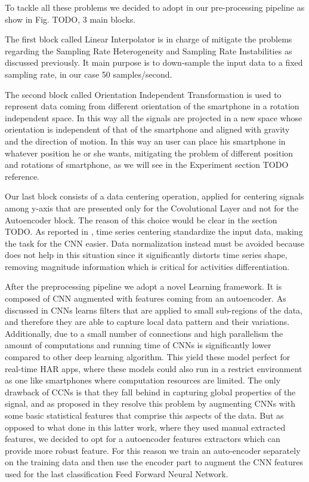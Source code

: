 To tackle all these problems we decided to adopt in our pre-processing pipeline as show in Fig. TODO, 3 main blocks.

The first block called Linear Interpolator is in charge of mitigate the problems regarding the Sampling Rate Heterogeneity and Sampling Rate Instabilities as discussed previously. It main purpose is to down-sample the input data to a fixed sampling rate, in our case 50 samples/second. 

The second block called Orientation Independent Transformation is used to represent data coming from different orientation of the smartphone in a rotation independent space. In this way all the signals are projected in a new space whose orientation is independent of that of the smartphone and aligned with gravity and the direction of motion. In this way an user can place his smartphone in whatever position he or she wants, mitigating the problem of different position and rotations of smartphone, as we will see in the Experiment section TODO reference.

Our last block consists of a data centering operation, applied for centering signals among y-axis that are presented only for the Covolutional Layer and not for the Autoencoder block. The reason of this choice would be clear in the section TODO. As reported in \cite{ignatov2018real}, time series centering standardize the input data, making the task for the CNN easier. Data normalization instead must be avoided because does not help in this situation since it significantly distorts time series shape, removing magnitude information which is critical for activities differentiation.

After the preprocessing pipeline we adopt a novel Learning framework. It is composed of CNN augmented with features coming from an autoencoder. As discussed in \cite{ignatov2018real} CNNs learns filters that are applied to small sub-regions of the data, and therefore they are able to capture local data pattern and their variations. Additionally, due to a small number of connections and high parallelism the amount of computations and running time of CNNs is significantly lower compared to other deep learning algorithm. This yield these model perfect for real-time HAR apps, where these models could also run in a restrict environment as one like smartphones where computation resources are limited. The only drawback of CCNs is that they fall behind in capturing global properties of the signal, and as proposed in \cite{ignatov2018real} they resolve this problem by augmenting CNNs with some basic statistical features that comprise this aspects of the data. But as opposed to what done in this latter work, where they used manual extracted features, we decided to opt for a autoencoder features extractors which can provide more robust feature. For this reason we train an auto-encoder separately on the training data and then use the encoder part to augment the CNN features used for the last classification Feed Forward Neural Network. 

